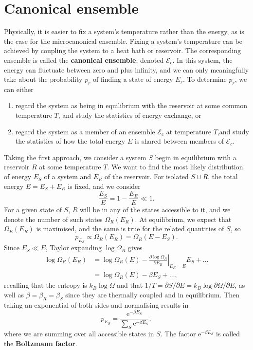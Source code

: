 \documentclass[letter-paper]{tufte-book}
\newcommand{\ex}{\mathrm{e}}
\newcommand\Def[1]{\textbf{#1}}
\begin{document}

\section{Canonical ensemble}

Physically, it is easier to fix a system's temperature rather than the energy,
as is the case for the microcanonical ensemble. Fixing a system's temperature
can be achieved by coupling the system to a heat bath or reservoir. The
corresponding ensemble is called the \Def{canonical ensemble}, denoted
$\mathcal{E}_c$. In this system, the energy can fluctuate between zero and plus
infinity, and we can only meaningfully take about the probability $p_r$ of
finding a state of energy $E_r$. To determine $p_r$, we can either
\begin{enumerate}
  \item regard the system as being in equilibrium with the reservoir at some
  common temperature $T$, and study the statistics of energy exchange, or
  \item regard the system as a member of an ensemble $\mathcal{E}_c$ at
  temperature $T$,and study the statistics of how the total energy $E$ is shared
  between members of $\mathcal{E}_c$.
\end{enumerate}

Taking the first approach, we consider a system $S$ begin in equilibrium with a
reservoir $R$ at some temperature $T$. We want to find the most likely
distribution of energy $E_S$ of a system and $E_R$ of the reservoir. For
isolated $S\cup R$, the total energy $E = E_S + E_R$ is fixed, and we consider
\begin{equation*}
  \frac{E_S}{E} = 1 - \frac{E_R}{E} \ll 1.
\end{equation*}
For a given state of $S$, $R$ will be in any of the states accessible to it, and
we denote the number of such states $\Omega_R(E_R)$. At equilibrium, we expect
that $\Omega_E(E_R)$ is maximised, and the same is true for the related
quantities of $S$, so
\begin{equation*}
  p_{E_S} \propto \Omega_R(E_R) = \Omega_R(E - E_S).
\end{equation*}
Since $E_S \ll E$, Taylor expanding $\log\Omega_R$ gives
\begin{align*}
  \log \Omega_R(E_R) &= \log\Omega_R(E) - \left.\frac{\partial \log\Omega_R}{\partial E_R}\right|_{E_R = E} E_S + \ldots\\
    &= \log\Omega_R(E) - \beta E_S + \ldots,
\end{align*}
recalling that the entropy is $k_B \log \Omega$ and that $1/T = \partial S /
\partial E = k_B \log \partial \Omega / \partial E$, as well as $\beta = \beta_R
= \beta_S$ since they are thermally coupled and in equilibrium. Then taking an
exponential of both sides and normalising results in
\begin{equation}
  p_{E_S} = \frac{\ex^{-\beta E_S}}{\sum_S \ex^{-\beta E_S}},
\end{equation}
where we are summing over all accessible states in $S$. The factor $\ex^{-\beta
E_S}$ is called the \Def{Boltzmann factor}.
\end{document}

